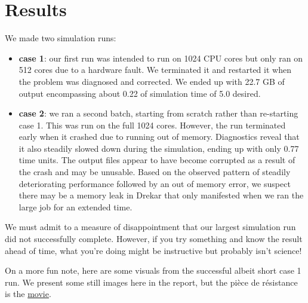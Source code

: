 \documentclass[11pt]{article} %
\begin{document}
\section{Results}
We made two simulation runs:
\begin{itemize}
\item{\textbf{case 1}}: our first run was intended to run on 1024 CPU cores but only ran on 512 cores due to a hardware fault.
We terminated it and restarted it when the problem was diagnosed and corrected.  We ended up with 22.7 GB of output
encompassing about 0.22 of simulation time of 5.0 desired.
\item{\textbf{case 2}}: we ran a second batch, starting from scratch rather than re-starting case 1.
This was run on the full 1024 cores.  However, the run terminated early when it crashed due to running out of memory.
Diagnostics reveal that it also steadily slowed down during the simulation, ending up with only 0.77 time units.
The output files appear to have become corrupted as a result of the crash and may be unusable.
Based on the observed pattern of steadily deteriorating performance followed by an out of memory error,
we suspect there may be a memory leak in Drekar that only manifested when we ran
the large job for an extended time.
\end{itemize}

We must admit to a measure of disappointment that our largest simulation run did not successfully complete.
However, if you try something and know the result ahead of time, 
what you're doing might be instructive but probably isn't science!

On a more fun note, here are some visuals from the successful albeit short case 1 run.
We present some still images here in the report, but the pi\`ece de r\'esistance 
is the \href{https://youtu.be/1DIGnRgUhe4}{movie}.

\newpage
\end{document}
